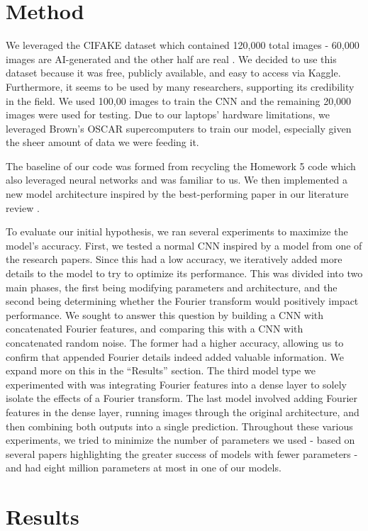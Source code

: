 \section{Method}

We leveraged the CIFAKE dataset which contained 120,000 total images - 60,000 images are AI-generated and the other half are real \cite{5}. We decided to use this dataset because it was free, publicly available, and easy to access via Kaggle. Furthermore, it seems to be used by many researchers, supporting its credibility in the field. We used 100,00 images to train the CNN and the remaining 20,000 images were used for testing. Due to our laptops’ hardware limitations, we leveraged Brown’s OSCAR supercomputers to train our model, especially given the sheer amount of data we were feeding it.

The baseline of our code was formed from recycling the Homework 5 code which also leveraged neural networks and was familiar to us. We then implemented a new model architecture inspired by the best-performing paper in our literature review \cite{1}. 

To evaluate our initial hypothesis, we ran several experiments to maximize the model’s accuracy. First, we tested a normal CNN inspired by a model from one of the research papers. Since this had a low accuracy, we iteratively added more details to the model to try to optimize its performance. This was divided into two main phases, the first being modifying parameters and architecture, and the second being determining whether the Fourier transform would positively impact performance. We sought to answer this question by building a CNN with concatenated Fourier features, and comparing this with a CNN with concatenated random noise. The former had a higher accuracy, allowing us to confirm that appended Fourier details indeed added valuable information. We expand more on this in the “Results” section. The third model type we experimented with was integrating Fourier features into a dense layer to solely isolate the effects of a Fourier transform. The last model involved adding Fourier features in the dense layer, running images through the original architecture, and then combining both outputs into a single prediction. Throughout these various experiments, we tried to minimize the number of parameters we used - based on several papers highlighting the greater success of models with fewer parameters - and had eight million parameters at most in one of our models.


\section{Results}

